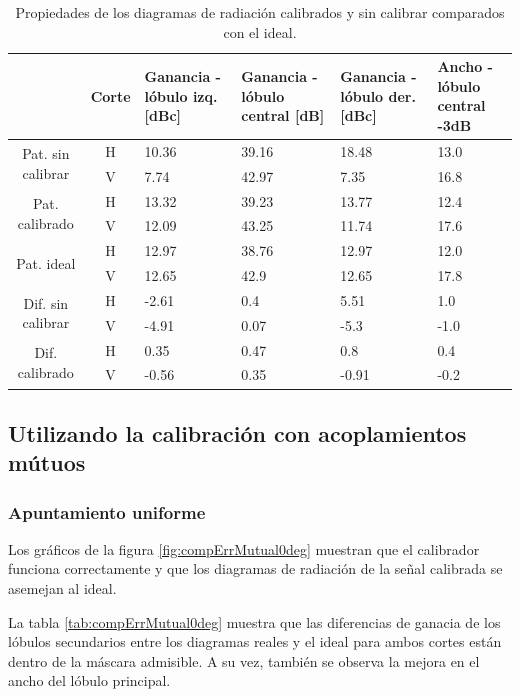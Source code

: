 \begin{table}[H]
  \footnotesize
  \centering
  \begin{tabular}{|c|c|p{2cm}|p{2.5cm}|p{2.5cm}|p{2.5cm}|}
    \cline{2-6}
    \multicolumn{1}{c|}{} & Corte & Ganancia - lóbulo izq. [dBc] & Ganancia - lóbulo central [dB] &
    Ganancia - lóbulo der. [dBc] & Ancho - lóbulo central -3dB \tabularnewline\hline
    \multirow{2}{2cm}{Pat. sin calibrar} & H & 10.36 & 39.16 & 18.48 & 13.0 \tabularnewline\cline{2-6}
     & V & 7.74 & 42.97 & 7.35 & 16.8 \tabularnewline\hline
    \multirow{2}{2cm}{Pat. calibrado} & H & 13.32 & 39.23 & 13.77 & 12.4 \tabularnewline\cline{2-6}
     & V & 12.09 & 43.25 & 11.74 & 17.6 \tabularnewline\hline
    \multirow{2}{2cm}{Pat. ideal} & H & 12.97 & 38.76 & 12.97 & 12.0 \tabularnewline\cline{2-6}
     & V & 12.65 & 42.9 & 12.65 & 17.8 \tabularnewline\hline
    \multirow{2}{2cm}{Dif. sin calibrar} & H & -2.61 & 0.4 & 5.51 & 1.0\tabularnewline\cline{2-6}
     & V & -4.91 & 0.07 & -5.3 & -1.0 \tabularnewline\hline
    \multirow{2}{2cm}{Dif. calibrado} & H & 0.35 & 0.47 & 0.8 & 0.4 \tabularnewline\cline{2-6}
     & V & -0.56 & 0.35 & -0.91 & -0.2 \tabularnewline\hline
  \end{tabular}
  \caption{Propiedades de los diagramas de radiación calibrados y sin calibrar comparados con el ideal.}
  \label{tab:compErrClassical10degRow}
\end{table}


\subsection{Utilizando la calibración con acoplamientos mútuos}

\subsubsection{Apuntamiento uniforme}

Los gráficos de la figura \ref{fig:compErrMutual0deg} muestran que el calibrador funciona correctamente y que los diagramas de 
radiación de la señal calibrada se asemejan al ideal. 

La tabla \ref{tab:compErrMutual0deg} muestra que las diferencias de ganacia de los lóbulos secundarios entre los diagramas 
reales y el ideal para ambos cortes están dentro de la máscara admisible. A su vez, también se observa la mejora en el ancho 
del lóbulo principal. 

